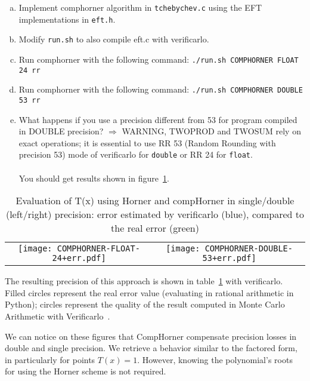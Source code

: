 \begin{question}
  \begin{enumerate}[(a)]
    \item Implement comphorner algorithm in {\tt tchebychev.c} using the EFT implementations in {\tt eft.h}.
    \item Modify {\tt run.sh} to also compile eft.c with verificarlo.
    \item Run comphorner with the following command: {\tt ./run.sh COMPHORNER FLOAT 24 rr}
    \item Run comphorner with the following command: {\tt ./run.sh COMPHORNER DOUBLE 53 rr}
    \item What happens if you use a precision different from 53 for program compiled in DOUBLE precision?
          $\Rightarrow$ WARNING, {\sc TWOPROD} and {\sc TWOSUM} rely on exact operations; it is essential to use RR 53 (Random Rounding with precision 53) mode of verificarlo for  \texttt{double} or RR 24 for \texttt{float}.
          \\~\\
          You should get results shown in figure~\ref{fig:comphornerVerificarlo24_53}.

  \end{enumerate}
\end{question}


\begin{table}
  \begin{tabular}{cc}
    \texttt{[image: COMPHORNER-FLOAT-24+err.pdf]} &
    \texttt{[image: COMPHORNER-DOUBLE-53+err.pdf]}  \\
  \end{tabular}
  \caption{Evaluation of T(x) using Horner and compHorner in single/double (left/right) precision: error estimated by verificarlo (blue), compared to the real error (green)}
  \label{fig:comphornerVerificarlo24_53}
\end{table}


The resulting precision of this approach is shown in table~\ref{fig:comphornerVerificarlo24_53} with verificarlo.
Filled circles represent the real error value (evaluating in rational arithmetic in Python); circles represent the quality of the result computed in Monte Carlo Arithmetic with Verificarlo~\cite{verrou}.

We can notice on these figures that CompHorner compensate precision losses in double and single precision. We retrieve a behavior similar to the factored form, in particularly for points $T(x)=1$. However, knowing the polynomial's roots for using the Horner scheme is not required.

